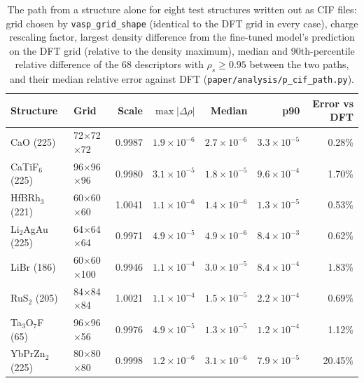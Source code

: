 \begin{table}[htbp]
\centering
\caption{The path from a structure alone for eight test structures written out as CIF files: grid chosen by \texttt{vasp\_grid\_shape} (identical to the DFT grid in every case), charge rescaling factor, largest density difference from the fine-tuned model's prediction on the DFT grid (relative to the density maximum), median and 90th-percentile relative difference of the 68 descriptors with $\rho_s\geq0.95$ between the two paths, and their median relative error against DFT (\texttt{paper/analysis/p\_cif\_path.py}).}
\label{tab:si-cif}
\small
\begin{tabular}{llrrrrr}
\toprule
Structure & Grid & Scale & $\max|\Delta\rho|$ & Median & p90 & Error vs DFT \\
\midrule
CaO (225) & 72$\times$72$\times$72 & 0.9987 & $1.9\times10^{-6}$ & $2.7\times10^{-6}$ & $3.3\times10^{-5}$ & 0.28\% \\
CaTiF$_{6}$ (225) & 96$\times$96$\times$96 & 0.9980 & $3.1\times10^{-5}$ & $1.8\times10^{-5}$ & $9.6\times10^{-4}$ & 1.70\% \\
HfBRh$_{3}$ (221) & 60$\times$60$\times$60 & 1.0041 & $1.1\times10^{-6}$ & $1.4\times10^{-6}$ & $1.3\times10^{-5}$ & 0.53\% \\
Li$_{2}$AgAu (225) & 64$\times$64$\times$64 & 0.9971 & $4.9\times10^{-5}$ & $4.9\times10^{-6}$ & $8.4\times10^{-3}$ & 0.62\% \\
LiBr (186) & 60$\times$60$\times$100 & 0.9946 & $1.1\times10^{-4}$ & $3.0\times10^{-5}$ & $8.4\times10^{-4}$ & 1.83\% \\
RuS$_{2}$ (205) & 84$\times$84$\times$84 & 1.0021 & $1.1\times10^{-4}$ & $1.5\times10^{-5}$ & $2.2\times10^{-4}$ & 0.69\% \\
Ta$_{3}$O$_{7}$F (65) & 96$\times$96$\times$56 & 0.9976 & $4.9\times10^{-5}$ & $1.3\times10^{-5}$ & $1.2\times10^{-4}$ & 1.12\% \\
YbPrZn$_{2}$ (225) & 80$\times$80$\times$80 & 0.9998 & $1.2\times10^{-6}$ & $3.1\times10^{-6}$ & $7.9\times10^{-5}$ & 20.45\% \\
\bottomrule
\end{tabular}
\end{table}
